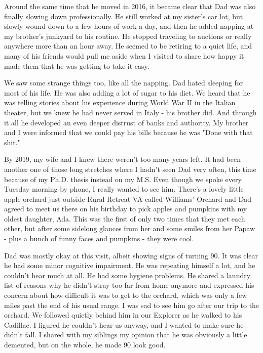 \documentclass{article}
\begin{document}
Around the same time that he moved in 2016, it became clear that Dad was also finally slowing down professionally. He still worked at my sister's car lot, but slowly wound down to a few hours of work a day, and then he added napping at my brother's junkyard to his routine. He stopped traveling to auctions or really anywhere more than an hour away. He seemed to be retiring to a quiet life, and many of his friends would pull me aside when I visited to share how happy it made them that he was getting to take it easy.

We saw some strange things too, like all the napping. Dad hated sleeping for most of his life. He was also adding a lot of sugar to his diet. We heard that he was telling stories about his experience during World War II in the Italian theater, but we knew he had never served in Italy - his brother did. And through it all he developed an even deeper distrust of banks and authority. My brother and I were informed that we could pay his bills because he was "Done with that shit."

By 2019, my wife and I knew there weren't too many years left. It had been another one of those long stretches where I hadn't seen Dad very often, this time because of my Ph.D. thesis instead on my M.S. Even though we spoke every Tuesday morning by phone, I really wanted to see him. There's a lovely little apple orchard just outside Rural Retreat VA called Williams' Orchard and Dad agreed to meet us there on his birthday to pick apples and pumpkins with my oldest daughter, Ada. This was the first of only two times that they met each other, but after some sidelong glances from her and some smiles from her Papaw - plus a bunch of funny faces and pumpkins - they were cool.

Dad was mostly okay at this visit, albeit showing signs of turning 90. It was clear he had some minor cognitive impairment. He was repeating himself a lot, and he couldn't hear much at all. He had some hygiene problems. He shared a laundry list of reasons why he didn't stray too far from home anymore and expressed his concern about how difficult it was to get to the orchard, which was only a few miles past the end of his usual range. I was sad to see him go after our trip to the orchard. We followed quietly behind him in our Explorer as he walked to his Cadillac. I figured he couldn't hear us anyway, and I wanted to make sure he didn't fall. I shared with my siblings my opinion that he was obviously a little demented, but on the whole, he made 90 look good.
\end{document}
